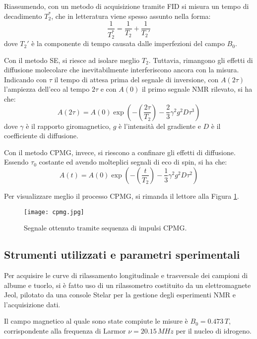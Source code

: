Riassumendo, con un metodo di acquisizione tramite FID si misura un tempo di decadimento $T_2^*$, che in letteratura viene spesso assunto nella forma:
\begin{equation}
	\frac{1}{T_2^*} = \frac{1}{T_2} +\frac{1}{T_2'}
\end{equation}
dove $T_2'$ è la componente di tempo causata dalle imperfezioni del campo $B_0$.

Con il metodo SE, si riesce ad isolare meglio $T_2$. Tuttavia, rimangono gli effetti di diffusione molecolare che inevitabilmente interferiscono ancora con la misura. Indicando con $\tau$ il tempo di attesa prima del segnale di inversione, con $A(2\tau)$ l'ampiezza dell'eco al tempo $2\tau$ e con $A(0)$ il primo segnale NMR rilevato, si ha che:
\begin{equation}
	A(2\tau) = A(0)\exp\left(-\left(\frac{2\tau}{T_2}\right) - \frac{2}{3} \gamma^2 g^2 D \tau^3\right)
\end{equation}
dove $\gamma$ è il rapporto giromagnetico, $g$ è l'intensità del gradiente e $D$ è il coefficiente di diffusione.

Con il metodo CPMG, invece, si riescono a confinare gli effetti di diffusione. 
Essendo $\tau_0$ costante ed avendo molteplici segnali di eco di spin, si ha che:
\begin{equation}
	A(t) = A(0)\exp\left(-\left(\frac{t}{T_2}\right) - \frac{1}{3} \gamma^2 g^2 D \tau^2\right)
\end{equation}

Per visualizzare meglio il processo CPMG, si rimanda il lettore alla Figura \ref{fig:cpmg}.

\begin{figure}[ht]
\centering
\texttt{[image: cpmg.jpg]}
\caption{Segnale ottenuto tramite sequenza di impulsi CPMG.}
\label{fig:cpmg}
\end{figure}

\subsection*{Strumenti utilizzati e parametri sperimentali}

Per acquisire le curve di rilassamento longitudinale e trasversale dei campioni di albume e tuorlo, si è fatto uso di un rilassometro costituito da un elettromagnete Jeol, pilotato da una console Stelar per la gestione degli esperimenti NMR e l'acquisizione dati.

Il campo magnetico al quale sono state compiute le misure è $B_0 = 0.473\si{\,}{T}$, corrispondente alla frequenza di Larmor $\nu = 20.15\si{\,}{MHz}$ per il nucleo di idrogeno.

